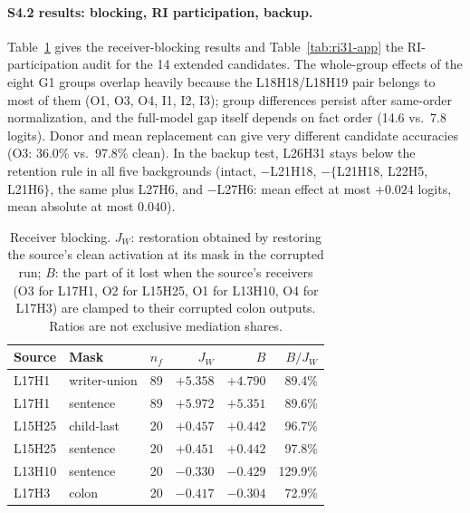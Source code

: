 \paragraph{S4.2 results: blocking, RI participation, backup.}
Table~\ref{tab:blocking-app} gives the receiver-blocking results and
Table~\ref{tab:ri31-app} the RI-participation audit for the 14 extended candidates.
The whole-group effects of the eight G1 groups overlap heavily because the
L18H18/L18H19 pair belongs to most of them (O1, O3, O4, I1, I2, I3); group differences
persist after same-order normalization, and the full-model gap itself depends on fact
order (14.6 vs.\ 7.8 logits). Donor and mean replacement can give very different
candidate accuracies (O3: 36.0\% vs.\ 97.8\% clean). In the backup test, L26H31 stays
below the retention rule in all five backgrounds (intact, $-$L21H18, $-\{$L21H18,
L22H5, L21H6$\}$, the same plus L27H6, and $-$L27H6: mean effect at most $+0.024$
logits, mean absolute at most $0.040$).

\begin{table}[h]
\centering\scriptsize
\setlength{\tabcolsep}{3pt}
\begin{tabular}{@{}llrrrr@{}}
\toprule
Source & Mask & $n_f$ & $J_W$ & $B$ & $B/J_W$ \\
\midrule
L17H1 & writer-union & 89 & $+5.358$ & $+4.790$ & 89.4\% \\
L17H1 & sentence & 89 & $+5.972$ & $+5.351$ & 89.6\% \\
L15H25 & child-last & 20 & $+0.457$ & $+0.442$ & 96.7\% \\
L15H25 & sentence & 20 & $+0.451$ & $+0.442$ & 97.8\% \\
L13H10 & sentence & 20 & $-0.330$ & $-0.429$ & 129.9\% \\
L17H3 & colon & 20 & $-0.417$ & $-0.304$ & 72.9\% \\
\bottomrule
\end{tabular}
\caption{Receiver blocking. $J_W$: restoration obtained by restoring the source's
clean activation at its mask in the corrupted run; $B$: the part of it lost when the
source's receivers (O3 for L17H1, O2 for L15H25, O1 for L13H10, O4 for L17H3) are
clamped to their corrupted colon outputs. Ratios are not exclusive mediation shares.}
\label{tab:blocking-app}
\end{table}

